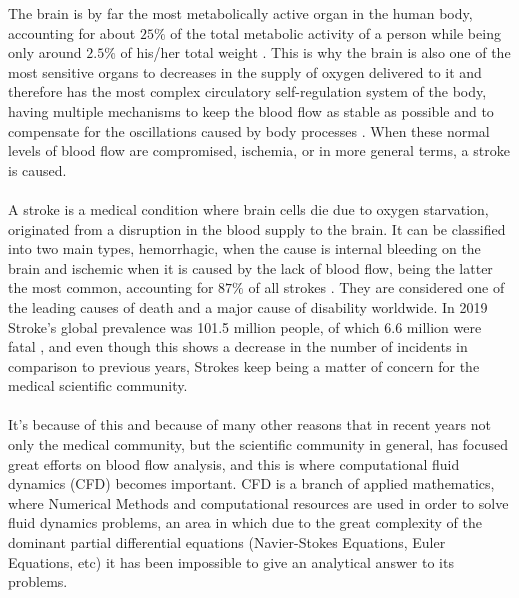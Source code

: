 \documentclass[12pt,letterpaper]{article}
\begin{document}
The brain is by far the most metabolically active organ in the human body, 
accounting for about $25\%$ of the total metabolic activity of a person
while being only around $2.5\%$ of his/her total weight \cite{Ischemia}.
This is why the brain is also one of the most sensitive organs to decreases 
in the supply of oxygen delivered to it and therefore has the most complex 
circulatory self-regulation system of the body,  having multiple mechanisms 
to keep the blood flow as stable as possible and to compensate for the 
oscillations caused by body processes \cite{AnatoFisio}. When these normal
levels of blood flow are compromised,  ischemia,  or in more general terms, 
a stroke is caused.\\~\\
A stroke is a medical condition where brain cells die due to oxygen starvation,
originated from a disruption in the blood supply to the brain. It can
be classified into two main types, hemorrhagic, when the cause is internal bleeding
on the brain and ischemic when it is caused by the lack of blood flow,  being the 
latter the most common,  accounting for $87\%$ of all strokes \cite{johns_hopkins_medicine}.
They are considered one of the leading causes of death and a major cause
of disability worldwide. In 2019 Stroke's global prevalence was 101.5 million 
people,  of which 6.6 million were fatal \cite{burden},  and even though this shows 
a decrease in the number of incidents in comparison to previous years,  Strokes keep being a
matter of concern for the medical scientific community.\\~\\
It’s because of this and because of many other reasons that in recent years 
not only the medical community,  but the scientific community in general,  
has focused great efforts on blood flow analysis,  and this is where computational 
fluid dynamics (CFD) becomes important. CFD is a branch of applied mathematics,  
where Numerical Methods and computational resources are used in order to solve 
fluid dynamics problems,  an area in which due to the great complexity of the 
dominant partial differential equations (Navier-Stokes Equations,  Euler Equations, 
etc) it has been impossible to give an analytical answer to its problems.\\~\\

\end{document}
